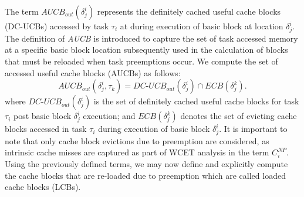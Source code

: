\noindent The term \begin{math}\textit{AUCB}_{out}(\delta_{j}^{i})\end{math} represents the definitely cached useful cache blocks (DC-UCBs) accessed by task \begin{math}\tau_{i}\end{math} at during execution of basic block at location \begin{math}\delta_{j}^{i}\end{math}. The definition of \textit{AUCB} is introduced to capture the set of task accessed memory at a specific basic block location subsequently used in the calculation of blocks that must be reloaded when task preemptions occur.  We compute the set of accessed useful cache blocks (AUCBs) as follows:
\begin{equation}\label{eqn:aucb-formula}
    \textit{AUCB}_{out}(\delta_{j}^{i},\tau_{k}) = \textit{DC-UCB}_{out}(\delta_{j}^{i}) \cap \textit{ECB}(\delta_{j}^{k}).
\end{equation}
\noindent where \begin{math}\textit{DC-UCB}_{out}(\delta_{j}^{i})\end{math} is the set of definitely cached useful cache blocks for task \begin{math}\tau_{i}\end{math} post basic block \begin{math}\delta_{j}^{i}\end{math} execution; and \begin{math}\textit{ECB}(\delta_{j}^{k})\end{math} denotes the set of evicting cache blocks accessed in task \begin{math}\tau_{i}\end{math} during execution of basic block \begin{math}\delta_{j}^{i}\end{math}. It is important to note that only cache block evictions due to preemption are considered, as intrinsic cache misses are captured as part of WCET analysis in the term \begin{math}C_{i}^{NP}\end{math}.  Using the previously defined terms, we may now define and explicitly compute the cache blocks that are re-loaded due to preemption which are called loaded cache blocks (LCBs).

